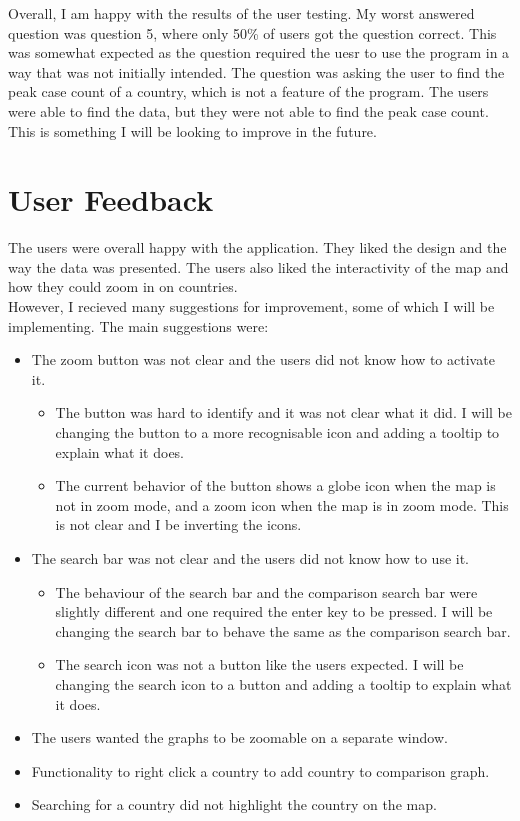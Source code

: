 \documentclass{report}
\begin{document}
\newpage
Overall, I am happy with the results of the user testing. My worst answered question was question 5, where only 50\% of users got the question correct. This was somewhat expected as the question required the uesr to use the program in a way that was not initially intended. The question was asking the user to find the peak case count of a country, which is not a feature of the program. The users were able to find the data, but they were not able to find the peak case count. This is something I will be looking to improve in the future.

\section{User Feedback}
The users were overall happy with the application. They liked the design and the way the data was presented. The users also liked the interactivity of the map and how they could zoom in on countries.\\

However, I recieved many suggestions for improvement, some of which I will be implementing. The main suggestions were:
\begin{itemize}
    \item The zoom button was not clear and the users did not know how to activate it.
    \begin{itemize}
        \item The button was hard to identify and it was not clear what it did. I will be changing the button to a more recognisable icon and adding a tooltip to explain what it does.
        \item The current behavior of the button shows a globe icon when the map is not in zoom mode, and a zoom icon when the map is in zoom mode. This is not clear and I be inverting the icons.
    \end{itemize}
    \item The search bar was not clear and the users did not know how to use it.
    \begin{itemize}
        \item The behaviour of the search bar and the comparison search bar were slightly different and one required the enter key to be pressed. I will be changing the search bar to behave the same as the comparison search bar.
        \item The search icon was not a button like the users expected. I will be changing the search icon to a button and adding a tooltip to explain what it does.
    \end{itemize}
    \item The users wanted the graphs to be zoomable on a separate window.
    \item Functionality to right click a country to add country to comparison graph.
    \item Searching for a country did not highlight the country on the map.
\end{itemize}
\end{document}
